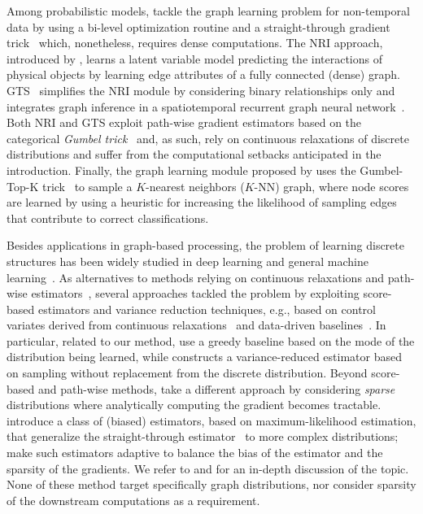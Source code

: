 Among probabilistic models, \citet{franceschi2019learning} tackle the graph learning problem for non-temporal data by using a bi-level optimization routine and a straight-through gradient trick~\citep{bengio2013estimating} which, nonetheless, requires dense computations. 
The NRI approach, introduced by \citet{kipf2018neural}, learns a latent variable model predicting the interactions of physical objects by learning edge attributes of a fully connected (dense) graph.
GTS~\citep{shang2021discrete} simplifies the NRI module by considering binary relationships only and integrates graph inference in a spatiotemporal recurrent graph neural network~\citep{li2018diffusion}. 
Both NRI and GTS exploit path-wise gradient estimators based on the categorical \emph{Gumbel trick}~\citep{maddison2017concrete, jang2017categorical} and, as such, rely on continuous relaxations of discrete distributions and suffer from the computational setbacks anticipated in the introduction.
Finally, the graph learning module proposed by \citet{kazi2022differentiable} uses the Gumbel-Top-K trick~\citep{kool2019stochastic} to sample a $K$-nearest neighbors ($K$-NN) graph, where node scores are learned by using a heuristic for increasing the likelihood of sampling edges that contribute to correct classifications. 

Besides applications in graph-based processing, the problem of learning discrete structures has been widely studied in deep learning and general machine learning~\citep{niculae2023discrete}. As alternatives to methods relying on continuous relaxations and path-wise estimators~\citep{jang2017categorical, maddison2017concrete, paulus2020gradient}, several approaches tackled the problem by exploiting score-based estimators and variance reduction techniques, e.g., based on control variates derived from continuous relaxations~\citep{tucker2017rebar, grathwohl2018backpropagation} and data-driven baselines~\citep{mnih2014neural}. In particular, related to our method, \cite{rennie2017self} use a greedy baseline based on the mode of the distribution being learned, while \cite{kool2020estimating} constructs a variance-reduced estimator based on sampling without replacement from the discrete distribution. Beyond score-based and path-wise methods, \cite{correia2020efficient} take a different approach by considering \textit{sparse} distributions where analytically computing the gradient becomes tractable. \cite{niepert2021implicit} introduce a class of (biased) estimators, based on maximum-likelihood estimation, that generalize the straight-through estimator~\citep{bengio2013estimating} to more complex distributions; \cite{minervini2023adaptive} make such estimators adaptive to balance the bias of the estimator and the sparsity of the gradients. We refer to \cite{mohamed2020monte} and \cite{niculae2023discrete} for an in-depth discussion of the topic. None of these method target specifically graph distributions, nor consider sparsity of the downstream computations as a requirement. 

